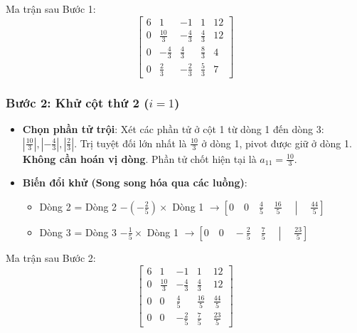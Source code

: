 Ma trận sau Bước 1:
\begin{equation*}
    \left[ \begin{array}{cccc|c}
            6 & 1            & -1           & 1           & 12 \\
            0 & \frac{10}{3} & -\frac{4}{3} & \frac{4}{3} & 12 \\
            0 & -\frac{4}{3} & \frac{4}{3}  & \frac{8}{3} & 4  \\
            0 & \frac{2}{3}  & -\frac{2}{3} & \frac{5}{3} & 7
        \end{array} \right]
\end{equation*}

\subsubsection*{Bước 2: Khử cột thứ 2 ($i = 1$)}
\begin{itemize}
    \item \textbf{Chọn phần tử trội}: Xét các phần tử ở cột 1 từ dòng 1 đến dòng 3: $\left|\frac{10}{3}\right|, \left|-\frac{4}{3}\right|, \left|\frac{2}{3}\right|$. Trị tuyệt đối lớn nhất là $\frac{10}{3}$ ở dòng 1, pivot được giữ ở dòng 1. \textbf{Không cần hoán vị dòng}.
          Phần tử chốt hiện tại là $a_{11} = \frac{10}{3}$.
    \item \textbf{Biến đổi khử (Song song hóa qua các luồng)}:
          \begin{itemize}
              \item Dòng 2 = Dòng 2 $- \left(-\frac{2}{5}\right) \times$ Dòng 1 $\to \left[0 \quad 0 \quad \frac{4}{5} \quad \frac{16}{5} \quad \middle| \quad \frac{44}{5}\right]$
              \item Dòng 3 = Dòng 3 $- \frac{1}{5} \times$ Dòng 1 $\to \left[0 \quad 0 \quad -\frac{2}{5} \quad \frac{7}{5} \quad \middle| \quad \frac{23}{5}\right]$
          \end{itemize}
\end{itemize}
Ma trận sau Bước 2:
\begin{equation*}
    \left[ \begin{array}{cccc|c}
            6 & 1            & -1           & 1            & 12           \\
            0 & \frac{10}{3} & -\frac{4}{3} & \frac{4}{3}  & 12           \\
            0 & 0            & \frac{4}{5}  & \frac{16}{5} & \frac{44}{5} \\
            0 & 0            & -\frac{2}{5} & \frac{7}{5}  & \frac{23}{5}
        \end{array} \right]
\end{equation*}

